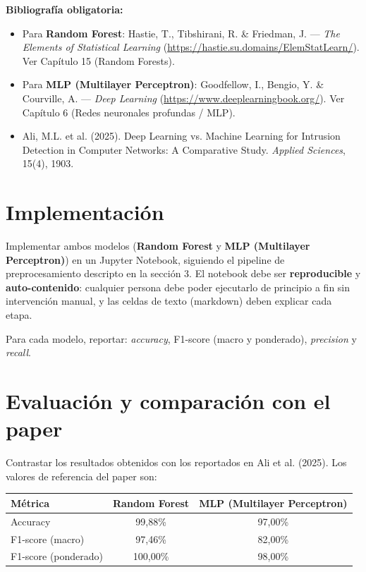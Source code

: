 \documentclass[11pt,a4paper]{article}
\begin{document}
\textbf{Bibliograf\'ia obligatoria:}
\begin{itemize}[leftmargin=2em,itemsep=2pt]
    \item Para \textbf{Random Forest}: Hastie, T., Tibshirani, R. \& Friedman, J. --- \textit{The Elements of Statistical Learning} (\url{https://hastie.su.domains/ElemStatLearn/}). Ver Capítulo 15 (Random Forests).
    \item Para \textbf{MLP (Multilayer Perceptron)}: Goodfellow, I., Bengio, Y. \& Courville, A. --- \textit{Deep Learning} (\url{https://www.deeplearningbook.org/}). Ver Capítulo 6 (Redes neuronales profundas / MLP).
    \item Ali, M.L. et al. (2025). Deep Learning vs. Machine Learning for Intrusion Detection in Computer Networks: A Comparative Study. \textit{Applied Sciences}, 15(4), 1903.
\end{itemize}

\section{Implementaci\'on}
Implementar ambos modelos (\textbf{Random Forest} y \textbf{MLP (Multilayer Perceptron)}) en un Jupyter Notebook, siguiendo el pipeline de preprocesamiento descripto en la secci\'on 3. El notebook debe ser \textbf{reproducible} y \textbf{auto-contenido}: cualquier persona debe poder ejecutarlo de principio a fin sin intervenci\'on manual, y las celdas de texto (markdown) deben explicar cada etapa.

Para cada modelo, reportar: \textit{accuracy}, F1-score (macro y ponderado), \textit{precision} y \textit{recall}.

\section{Evaluaci\'on y comparaci\'on con el paper}
Contrastar los resultados obtenidos con los reportados en Ali et al. (2025). Los valores de referencia del paper son:

\begin{center}
\begin{tabular}{lcc}
        \toprule
        \textbf{M\'etrica} & \textbf{Random Forest} & \textbf{MLP (Multilayer Perceptron)} \\
        \midrule
        Accuracy & 99,88\% & 97,00\% \\
        F1-score (macro) & 97,46\% & 82,00\% \\
        F1-score (ponderado) & 100,00\% & 98,00\% \\
        \bottomrule
\end{tabular}
\end{center}
\end{document}
